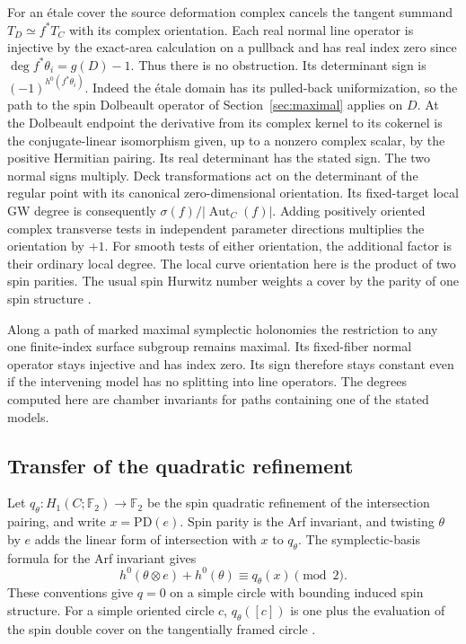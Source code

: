 For an étale cover the source deformation complex cancels the tangent summand \(T_D\simeq f^*T_C\) with its complex orientation. Each real normal line operator is injective by the exact-area calculation on a pullback and has real index zero since \(\deg f^*\theta_i=g(D)-1\). Thus there is no obstruction. Its determinant sign is \((-1)^{h^0(f^*\theta_i)}\). Indeed the étale domain has its pulled-back uniformization, so the path to the spin Dolbeault operator of Section~\ref{sec:maximal} applies on \(D\). At the Dolbeault endpoint the derivative from its complex kernel to its cokernel is the conjugate-linear isomorphism given, up to a nonzero complex scalar, by the positive Hermitian pairing. Its real determinant has the stated sign. The two normal signs multiply. Deck transformations act on the determinant of the regular point with its canonical zero-dimensional orientation. Its fixed-target local GW degree is consequently \(\sigma(f)/|\operatorname{Aut}_C(f)|\). Adding positively oriented complex transverse tests in independent parameter directions multiplies the orientation by \(+1\). For smooth tests of either orientation, the additional factor is their ordinary local degree. The local curve orientation here is the product of two spin parities. The usual spin Hurwitz number weights a cover by the parity of one spin structure \cite{lprec}.

Along a path of marked maximal symplectic holonomies the restriction to any one finite-index surface subgroup remains maximal. Its fixed-fiber normal operator stays injective and has index zero. Its sign therefore stays constant even if the intervening model has no splitting into line operators. The degrees computed here are chamber invariants for paths containing one of the stated models.

\subsection{Transfer of the quadratic refinement}

Let \(q_\theta:H_1(C;\mathbb F_2)\to\mathbb F_2\) be the spin quadratic refinement of the intersection pairing, and write \(x=\mathrm{PD}(e)\). Spin parity is the Arf invariant, and twisting \(\theta\) by \(e\) adds the linear form of intersection with \(x\) to \(q_\theta\). The symplectic-basis formula for the Arf invariant gives
\[h^0(\theta\otimes e)+h^0(\theta)\equiv q_\theta(x)\pmod2.\]
These conventions give \(q=0\) on a simple circle with bounding induced spin structure. For a simple oriented circle \(c\), \(q_\theta([c])\) is one plus the evaluation of the spin double cover on the tangentially framed circle \cite{johnson} \cite{atiyah}.

